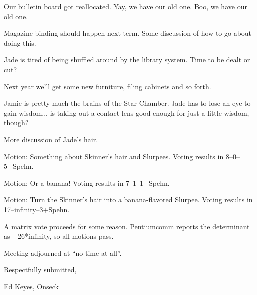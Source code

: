 \documentclass[12pt]{article}
\begin{document}
Our bulletin board got reallocated.  Yay, we have our old one.
Boo, we have our old one.

Magazine binding should happen next term.  Some discussion of how
to go about doing this.

Jade is tired of being shuffled around by the library system.  Time
to be dealt or cut?

Next year we'll get some new furniture, filing cabinets and so forth.

Jamie is pretty much the brains of the Star Chamber.  Jade has to
lose an eye to gain wisdom... is taking out a contact lens good
enough for just a little wisdom, though?

More discussion of Jade's hair.

Motion: Something about Skinner's hair and Slurpees.  Voting results
in 8--0--5+Spehn.

Motion: Or a banana!  Voting results in 7--1--1+Spehn.

Motion: Turn the Skinner's hair into a banana-flavored Slurpee.
Voting results in 17--infinity--3+Spehn.

A matrix vote proceeds for some reason.  Pentiumcomm reports the
determinant as +26*infinity, so all motions pass.

\vspace{12pt}

\noindent
Meeting adjourned at ``no time at all''.

\vspace{18pt}

\centerline{Respectfully submitted,}
\centerline{Ed Keyes, Onseck}
\end{document}
